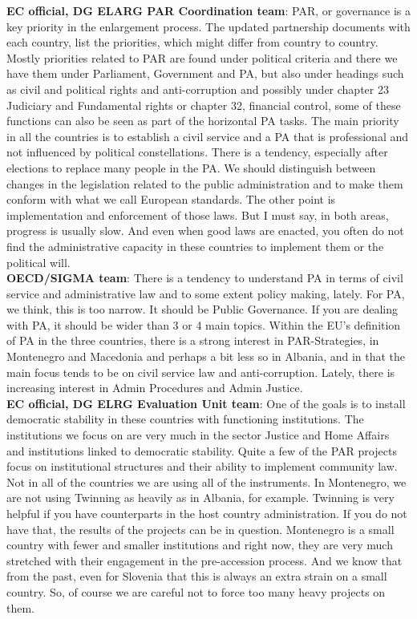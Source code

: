 \textbf{EC official, DG ELARG PAR Coordination team}: PAR, or governance is a key priority in the enlargement process. The updated partnership documents with each country, list the priorities, which might differ from country to country. Mostly priorities related to PAR are found under political criteria and there we have them under Parliament, Government and PA, but also under headings such as civil and political rights and anti-corruption and possibly under chapter 23 Judiciary and Fundamental rights or chapter 32, financial control, some of these functions can also be seen as part of the horizontal PA tasks. The main priority in all the countries is to establish a civil service and a PA that is professional and not influenced by political constellations. There is a tendency, especially after elections to replace many people in the PA. We should distinguish between changes in the legislation related to the public administration and to make them conform with what we call European standards. The other point is implementation and enforcement of those laws. But I must say, in both areas, progress is usually slow. And even when good laws are enacted, you often do not find the administrative capacity in these countries to implement them or the political will. \\
\textbf{OECD/SIGMA team}: There is a tendency to understand PA in terms of civil service and administrative law and to some extent policy making, lately. For PA, we think, this is too narrow. It should be Public Governance. If you are dealing with PA, it should be wider than 3 or 4 main topics. Within the EU's definition of PA in the three countries, there is a strong interest in PAR-Strategies, in Montenegro and Macedonia and perhaps a bit less so in Albania, and in that the main focus tends to be on civil service law and anti-corruption. Lately, there is increasing interest in Admin Procedures and Admin Justice.\\
\textbf{EC official, DG ELRG Evaluation Unit team}: One of the goals is to install democratic stability in these countries with functioning institutions. The institutions we focus on are very much in the sector Justice and Home Affairs and institutions linked to democratic stability. Quite a few of the PAR projects focus on institutional structures and their ability to implement community law. Not in all of the countries we are using all of the instruments. In Montenegro, we are not using Twinning as heavily as in Albania, for example. Twinning is very helpful if you have counterparts in the host country administration. If you do not have that, the results of the projects can be in question. Montenegro is a small country with fewer and smaller institutions and right now, they are very much stretched with their engagement in the pre-accession process. And we know that from the past, even for Slovenia that this is always an extra strain on a small country. So, of course we are careful not to force too many heavy projects on them. \\
